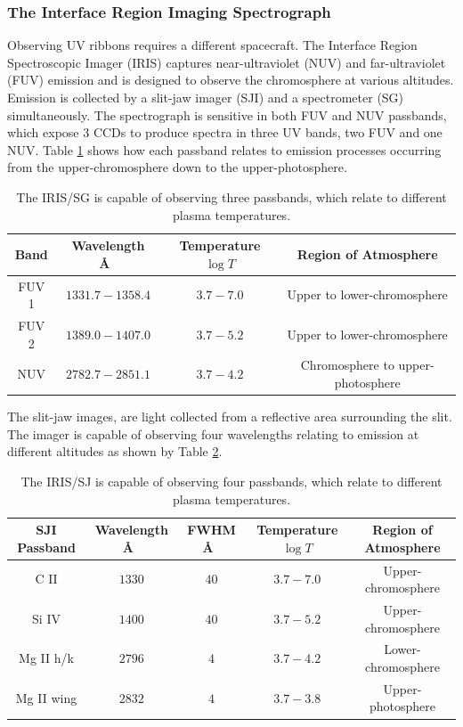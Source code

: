 \subsubsection{The Interface Region Imaging Spectrograph}
Observing UV ribbons requires a different spacecraft. The Interface Region Spectroscopic Imager (IRIS) captures near-ultraviolet (NUV) and far-ultraviolet (FUV) emission and is designed to observe the chromosphere at various altitudes. Emission is collected by a slit-jaw imager (SJI) and a spectrometer (SG) simultaneously. The spectrograph is sensitive in both FUV and NUV passbands, which expose 3 CCDs to produce spectra in three UV bands, two FUV and one NUV. Table \ref{iris-sg} shows how each passband relates to emission processes occurring from the upper-chromosphere down to the upper-photosphere.

\begin{table}[H]
\centering
\begin{tabular}{|c|c|c|c|}
Band & Wavelength \AA\ & Temperature $\log{T}$ & Region of Atmosphere\\
\hline
FUV 1 & $1331.7 - 1358.4$ & $3.7 - 7.0$ & Upper to lower-chromosphere\\
FUV 2 & $1389.0 - 1407.0$ & $3.7 - 5.2$ & Upper to lower-chromosphere\\
NUV & $2782.7 - 2851.1$ & $3.7 - 4.2$ & Chromosphere to upper-photosphere\\
\end{tabular}
\caption{The IRIS/SG is capable of observing three passbands, which relate to different plasma temperatures.}\label{iris-sg}
\end{table}


The slit-jaw images, are light collected from a reflective area surrounding the slit. The imager is capable of observing four wavelengths relating to emission at different altitudes as shown by Table \ref{iris-sj}.

\begin{table}[H]
\centering
\begin{tabular}{|c|c|c|c|c|}
SJI Passband & Wavelength \AA\ & FWHM \AA\ & Temperature $\log{T}$ & Region of Atmosphere\\
\hline
C II  & $1330$ & $40$ & $3.7 - 7.0$ & Upper-chromosphere\\
Si IV  & $1400$ & $40$ & $3.7 - 5.2$ & Upper-chromosphere\\
Mg II h/k & $2796$ & $4$ & $3.7 - 4.2$ & Lower-chromosphere\\
Mg II wing & $2832$ & $4$ & $3.7 - 3.8$ & Upper-photosphere\\
\end{tabular}
\caption{The IRIS/SJ is capable of observing four passbands, which relate to different plasma temperatures.}\label{iris-sj}
\end{table}


